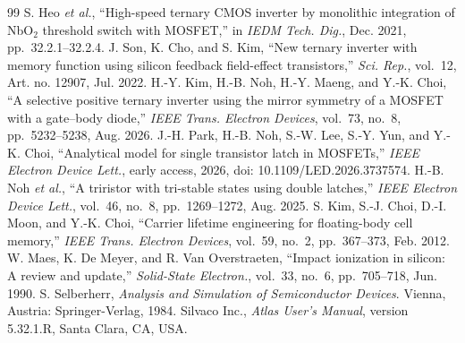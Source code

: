 \documentclass[journal]{IEEEtran}
\begin{document}
\begin{thebibliography}{99}
 S. Heo \emph{et al.}, ``High-speed ternary CMOS inverter by monolithic integration of NbO$_2$ threshold switch with MOSFET,'' in \emph{IEDM Tech. Dig.}, Dec. 2021, pp.~32.2.1--32.2.4.
 J. Son, K. Cho, and S. Kim, ``New ternary inverter with memory function using silicon feedback field-effect transistors,'' \emph{Sci. Rep.}, vol.~12, Art. no. 12907, Jul. 2022.
 H.-Y. Kim, H.-B. Noh, H.-Y. Maeng, and Y.-K. Choi, ``A selective positive ternary inverter using the mirror symmetry of a MOSFET with a gate--body diode,'' \emph{IEEE Trans. Electron Devices}, vol.~73, no.~8, pp.~5232--5238, Aug. 2026.
 J.-H. Park, H.-B. Noh, S.-W. Lee, S.-Y. Yun, and Y.-K. Choi, ``Analytical model for single transistor latch in MOSFETs,'' \emph{IEEE Electron Device Lett.}, early access, 2026, doi: 10.1109/LED.2026.3737574.
 H.-B. Noh \emph{et al.}, ``A triristor with tri-stable states using double latches,'' \emph{IEEE Electron Device Lett.}, vol.~46, no.~8, pp.~1269--1272, Aug. 2025.
 S. Kim, S.-J. Choi, D.-I. Moon, and Y.-K. Choi, ``Carrier lifetime engineering for floating-body cell memory,'' \emph{IEEE Trans. Electron Devices}, vol.~59, no.~2, pp.~367--373, Feb. 2012.
 W. Maes, K. De Meyer, and R. Van Overstraeten, ``Impact ionization in silicon: A review and update,'' \emph{Solid-State Electron.}, vol.~33, no.~6, pp.~705--718, Jun. 1990.
 S. Selberherr, \emph{Analysis and Simulation of Semiconductor Devices}. Vienna, Austria: Springer-Verlag, 1984.
 Silvaco Inc., \emph{Atlas User's Manual}, version 5.32.1.R, Santa Clara, CA, USA.
\end{thebibliography}
\end{document}
